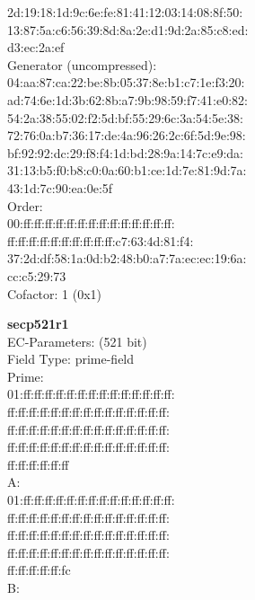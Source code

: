     2d:19:18:1d:9c:6e:fe:81:41:12:03:14:08:8f:50:\\
    13:87:5a:c6:56:39:8d:8a:2e:d1:9d:2a:85:c8:ed:\\
    d3:ec:2a:ef\\
Generator (uncompressed):\\
    04:aa:87:ca:22:be:8b:05:37:8e:b1:c7:1e:f3:20:\\
    ad:74:6e:1d:3b:62:8b:a7:9b:98:59:f7:41:e0:82:\\
    54:2a:38:55:02:f2:5d:bf:55:29:6c:3a:54:5e:38:\\
    72:76:0a:b7:36:17:de:4a:96:26:2c:6f:5d:9e:98:\\
    bf:92:92:dc:29:f8:f4:1d:bd:28:9a:14:7c:e9:da:\\
    31:13:b5:f0:b8:c0:0a:60:b1:ce:1d:7e:81:9d:7a:\\
    43:1d:7c:90:ea:0e:5f\\
Order: \\
    00:ff:ff:ff:ff:ff:ff:ff:ff:ff:ff:ff:ff:ff:ff:\\
    ff:ff:ff:ff:ff:ff:ff:ff:ff:ff:c7:63:4d:81:f4:\\
    37:2d:df:58:1a:0d:b2:48:b0:a7:7a:ec:ec:19:6a:\\
    cc:c5:29:73\\
Cofactor:  1 (0x1)\\
\item \textbf{ secp521r1 }\\
EC-Parameters: (521 bit)\\
Field Type: prime-field\\
Prime:\\
    01:ff:ff:ff:ff:ff:ff:ff:ff:ff:ff:ff:ff:ff:ff:\\
    ff:ff:ff:ff:ff:ff:ff:ff:ff:ff:ff:ff:ff:ff:ff:\\
    ff:ff:ff:ff:ff:ff:ff:ff:ff:ff:ff:ff:ff:ff:ff:\\
    ff:ff:ff:ff:ff:ff:ff:ff:ff:ff:ff:ff:ff:ff:ff:\\
    ff:ff:ff:ff:ff:ff\\
A:   \\
    01:ff:ff:ff:ff:ff:ff:ff:ff:ff:ff:ff:ff:ff:ff:\\
    ff:ff:ff:ff:ff:ff:ff:ff:ff:ff:ff:ff:ff:ff:ff:\\
    ff:ff:ff:ff:ff:ff:ff:ff:ff:ff:ff:ff:ff:ff:ff:\\
    ff:ff:ff:ff:ff:ff:ff:ff:ff:ff:ff:ff:ff:ff:ff:\\
    ff:ff:ff:ff:ff:fc\\
B:   \\
